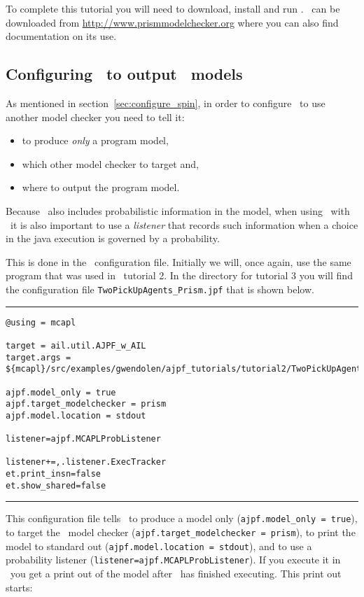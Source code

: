 \documentclass[a4]{article}
\begin{document}
To complete this tutorial you will need to download, install and run \prism.  \prism\ can be downloaded from \url{http://www.prismmodelchecker.org} where you can also find documentation on its use.

\subsection{Configuring \ajpf\ to output \prism\ models}

As mentioned in section~\ref{sec:configure_spin}, in order to configure \ajpf\ to use another model checker you need to tell it:
\begin{itemize}
\item to produce \emph{only} a program model, 
\item which other model checker to target and,
\item where to output the program model.  
\end{itemize}
Because \prism\ also includes probabilistic information in the model, when using \ajpf\ with \prism\ it is also important to use a \emph{listener} that records such information when a choice in the java execution is governed by a probability.

This is done in the \ajpf\ configuration file.  Initially we will, once again, use the same program that was used in \ajpf\ tutorial 2.  In the directory for tutorial 3 you will find the configuration file \texttt{TwoPickUpAgents\_Prism.jpf} that is shown below.

\newpage
\noindent\rule{\textwidth}{1pt}
\begin{small}
\begin{verbatim}
@using = mcapl

target = ail.util.AJPF_w_AIL
target.args = ${mcapl}/src/examples/gwendolen/ajpf_tutorials/tutorial2/TwoPickUpAgents.ail,${mcapl}/src/examples/gwendolen/ajpf_tutorials/tutorial3/PickUpAgent.psl,1

ajpf.model_only = true
ajpf.target_modelchecker = prism
ajpf.model.location = stdout

listener=ajpf.MCAPLProbListener

listener+=,.listener.ExecTracker
et.print_insn=false
et.show_shared=false
\end{verbatim}
\end{small}
\rule{\textwidth}{1pt}

This configuration file tells \ajpf\ to produce a model only (\texttt{ajpf.model\_only = true}), to target the \prism\ model checker (\texttt{ajpf.target\_modelchecker = prism}), to print the model to standard out (\texttt{ajpf.model.location = stdout}), and to use a probability listener (\texttt{listener=ajpf.MCAPLProbListener}).  If you execute it in \ajpf\ you get a print out of the model after \ajpf\  has finished executing.  This print out starts:
\end{document}
